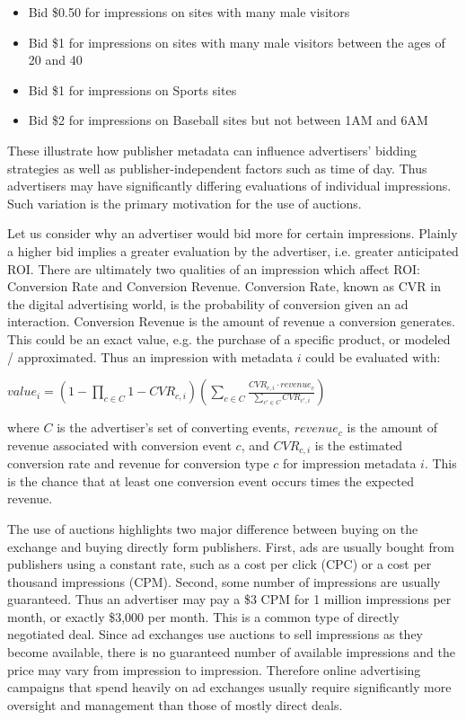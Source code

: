 \documentclass{article}
\begin{document}
\begin{itemize}
\item Bid \$0.50 for impressions on sites with many male visitors
\item Bid \$1 for impressions on sites with many male visitors between the ages of 20 and 40
\item Bid \$1 for impressions on Sports sites
\item Bid \$2 for impressions on Baseball sites but not between 1AM and 6AM
\end{itemize}

These illustrate how publisher metadata can influence advertisers' bidding strategies as well as publisher-independent factors such as time of day. Thus advertisers may have significantly differing evaluations of individual impressions. Such variation is the primary motivation for the use of auctions.

Let us consider why an advertiser would bid more for certain impressions. Plainly a higher bid implies a greater evaluation by the advertiser, i.e. greater anticipated ROI. There are ultimately two qualities of an impression which affect ROI: Conversion Rate and Conversion Revenue. Conversion Rate, known as CVR in the digital advertising world, is the probability of conversion given an ad interaction. Conversion Revenue is the amount of revenue a conversion generates. This could be an exact value, e.g. the purchase of a specific product, or modeled / approximated. Thus an impression with metadata $i$ could be evaluated with:

$ value_{i} = (1-\prod_{c \in C} 1-CVR_{c,i} ) (\sum_{c\in C} \frac{CVR_{c,i} \cdot revenue_{c}}{\sum_{c' \in C} CVR_{c',i}}) $
 
\noindent where $C$ is the advertiser's set of converting events, $revenue_{c}$ is the amount of revenue associated with conversion event $c$, and $CVR_{c,i}$ is the estimated conversion rate and revenue for conversion type $c$ for impression metadata $i$. This is the chance that at least one conversion event occurs times the expected revenue.

The use of auctions highlights two major difference between buying on the exchange and buying directly form publishers. First, ads are usually bought from publishers using a constant rate, such as a cost per click (CPC) or a cost per thousand impressions (CPM). Second, some number of impressions are usually guaranteed. Thus an advertiser may pay a \$3 CPM for 1 million impressions per month, or exactly \$3,000 per month. This is a common type of directly negotiated deal. Since ad exchanges use auctions to sell impressions as they become available, there is no guaranteed number of available impressions and the price may vary from impression to impression. Therefore online advertising campaigns that spend heavily on ad exchanges usually require significantly more oversight and management than those of mostly direct deals.
\end{document}
